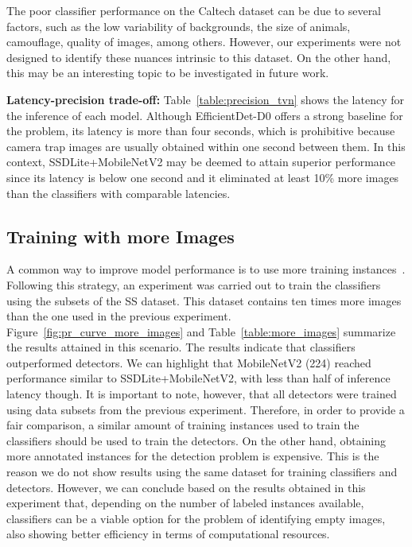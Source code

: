 The poor classifier performance on the Caltech dataset can be due to several
factors, such as the low variability of backgrounds, the size of animals,
camouflage, quality of images, among others. However, our experiments were not
designed to identify these nuances intrinsic to this dataset. On the other
hand, this may be an interesting topic to be investigated in future work.

\textbf{Latency-precision trade-off:} Table~\ref{table:precision_tvn} shows
the latency for the inference of each model. Although EfficientDet-D0 offers a
strong baseline for the problem, its latency is more than four seconds, which is
prohibitive because camera trap images are usually obtained within one second
between them. In this context, SSDLite+MobileNetV2 may be deemed to attain
superior performance since its latency is below one second and it eliminated
at least 10\% more images than the classifiers with comparable latencies.

\subsection{Training with more Images}

A common way to improve model performance is to use more training
instances~\citep{bit2020Kolesnikov}. Following this strategy, an experiment was
carried out to train the classifiers using the subsets of the SS dataset. This
dataset contains ten times more images than the one used in the previous
experiment. Figure~\ref{fig:pr_curve_more_images} and
Table~\ref{table:more_images} summarize the results attained in this scenario.
The results indicate that classifiers outperformed detectors. We can highlight
that MobileNetV2 (224) reached performance similar to SSDLite+MobileNetV2, with
less than half of inference latency though. It is important to note, however,
that all detectors were trained using data subsets from the previous
experiment. Therefore, in order to provide a fair comparison, a similar amount
of training instances used to train the classifiers should be used to train the
detectors. On the other hand, obtaining more annotated instances for the
detection problem is expensive. This is the reason we do not show results using
the same dataset for training classifiers and detectors. However, we can
conclude based on the results obtained in this experiment that, depending on the
number of labeled instances available, classifiers can be a viable option for
the problem of identifying empty images, also showing better efficiency in terms
of computational resources.

